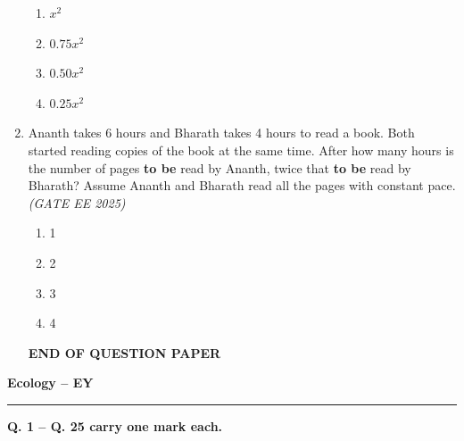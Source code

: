 \documentclass[11pt,a4paper]{article}
\begin{document}
\begin{enumerate}[leftmargin=*,label=\textbf{Q.\arabic*},resume]
\begin{multicols}{2}
\begin{enumerate}[label=(\Alph*)]
\item $x^2$
\item $0.75 x^2$
\item $0.50 x^2$
\item $0.25 x^2$
\end{enumerate}
\end{multicols}

\item Ananth takes 6 hours and Bharath takes 4 hours to read a book. Both started reading copies of the book at the same time. After how many hours is the number of pages \textbf{to be} read by Ananth, twice that \textbf{to be} read by Bharath? Assume Ananth and Bharath read all the pages with constant pace.\hfill \textit{(GATE EE 2025)}

\begin{multicols}{2}
\begin{enumerate}[label=(\Alph*)]
\item 1
\item 2
\item 3
\item 4
\end{enumerate}
\end{multicols}
\begin{center}
  \textbf{END OF QUESTION PAPER}  
\end{center}

\end{enumerate}
\newpage
{}

\begin{center}
    {\Large \textbf{Ecology -- EY}}
\end{center}
\rule{\textwidth}{0.4pt}
\vspace{1ex}

\noindent \textbf{Q. 1 -- Q. 25 carry one mark each.}
\end{document}
